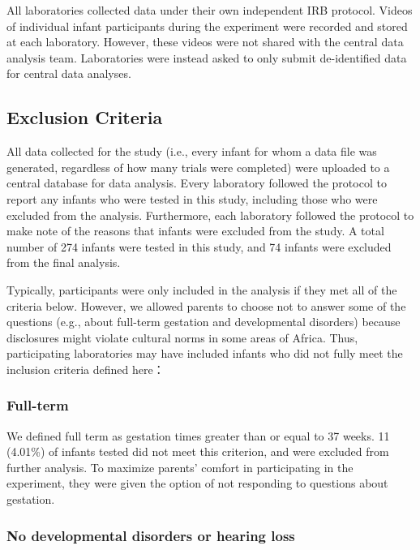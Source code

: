 \documentclass[
  ,man,floatsintext]{apa6}
\begin{document}
All laboratories collected data under their own independent IRB protocol. Videos of individual infant participants during the experiment were recorded and stored at each laboratory. However, these videos were not shared with the central data analysis team. Laboratories were instead asked to only submit de-identified data for central data analyses.

\hypertarget{exclusion-criteria}{%
\subsection{Exclusion Criteria}\label{exclusion-criteria}}

All data collected for the study (i.e., every infant for whom a data file was generated, regardless of how many trials were completed) were uploaded to a central database for data analysis. Every laboratory followed the protocol to report any infants who were tested in this study, including those who were excluded from the analysis. Furthermore, each laboratory followed the protocol to make note of the reasons that infants were excluded from the study. A total number of 274 infants were tested in this study, and 74 infants were excluded from the final analysis.

Typically, participants were only included in the analysis if they met all of the criteria below. However, we allowed parents to choose not to answer some of the questions (e.g., about full-term gestation and developmental disorders) because disclosures might violate cultural norms in some areas of Africa. Thus, participating laboratories may have included infants who did not fully meet the inclusion criteria defined here：

\hypertarget{full-term}{%
\subsubsection{Full-term}\label{full-term}}

We defined full term as gestation times greater than or equal to 37 weeks. 11 (4.01\%) of infants tested did not meet this criterion, and were excluded from further analysis. To maximize parents' comfort in participating in the experiment, they were given the option of not responding to questions about gestation.

\hypertarget{no-developmental-disorders-or-hearing-loss}{%
\subsubsection{No developmental disorders or hearing loss}\label{no-developmental-disorders-or-hearing-loss}}
\end{document}
